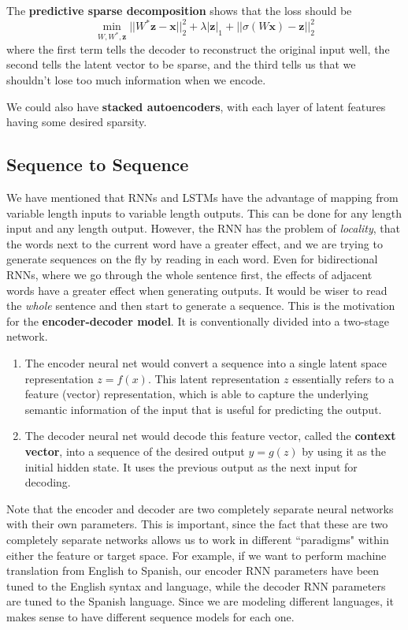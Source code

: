     The \textbf{predictive sparse decomposition} shows that the loss should be 
    \begin{equation}
      \min_{W, W^\ast, \mathbf{z}} ||W^\ast \mathbf{z} - \mathbf{x}||^2_2 + \lambda | \mathbf{z}|_1 + ||\sigma(W \mathbf{x}) - \mathbf{z}||^2_2
    \end{equation}
    where the first term tells the decoder to reconstruct the original input well, the second tells the latent vector to be sparse, and the third tells us that we shouldn't lose too much information when we encode. 

    We could also have \textbf{stacked autoencoders}, with each layer of latent features having some desired sparsity. 

  \subsection{Sequence to Sequence}

    We have mentioned that RNNs and LSTMs have the advantage of mapping from variable length inputs to variable length outputs. This can be done for any length input and any length output. However, the RNN has the problem of \textit{locality}, that the words next to the current word have a greater effect, and we are trying to generate sequences on the fly by reading in each word. Even for bidirectional RNNs, where we go through the whole sentence first, the effects of adjacent words have a greater effect when generating outputs. It would be wiser to read the \textit{whole} sentence and then start to generate a sequence. This is the motivation for the \textbf{encoder-decoder model}. It is conventionally divided into a two-stage network. 
    \begin{enumerate}
      \item The encoder neural net would convert a sequence into a single latent space representation $z = f(x)$. This latent representation $z$ essentially refers to a feature (vector) representation, which is able to capture the underlying semantic information of the input that is useful for predicting the output. 
      \item The decoder neural net would decode this feature vector, called the \textbf{context vector}, into a sequence of the desired output $y = g(z)$ by using it as the initial hidden state. It uses the previous output as the next input for decoding. 
    \end{enumerate}
    Note that the encoder and decoder are two completely separate neural networks with their own parameters. This is important, since the fact that these are two completely separate networks allows us to work in different ``paradigms" within either the feature or target space. For example, if we want to perform machine translation from English to Spanish, our encoder RNN parameters have been tuned to the English syntax and language, while the decoder RNN parameters are tuned to the Spanish language. Since we are modeling different languages, it makes sense to have different sequence models for each one. 

